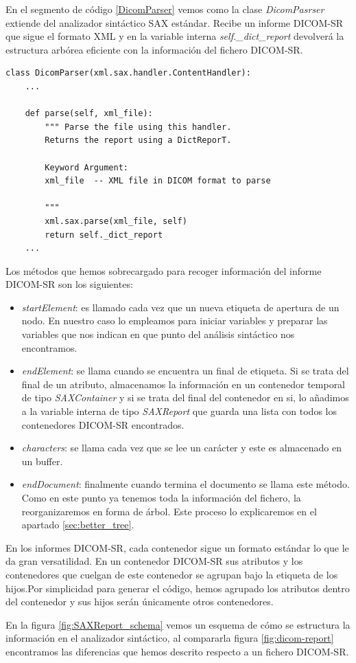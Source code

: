 En el segmento de código \ref{DicomParser} vemos como la clase \emph{DicomPasrser} extiende del analizador sintáctico SAX estándar. Recibe un informe DICOM-SR que sigue el formato XML y en la variable interna \emph{self.\_dict\_report} devolverá la estructura arbórea eficiente con la información del fichero DICOM-SR.\par

\lstset{escapechar=@,style=python}
\begin{lstlisting}[label=DicomParser,caption=Clase que analiza sintácticamente un fichero DICOM-SR]
class DicomParser(xml.sax.handler.ContentHandler):
    ...

    def parse(self, xml_file):
        """ Parse the file using this handler.
        Returns the report using a DictReporT.

        Keyword Argument:
        xml_file  -- XML file in DICOM format to parse

        """
        xml.sax.parse(xml_file, self)
        return self._dict_report
    ...
\end{lstlisting}

Los métodos que hemos sobrecargado para recoger información del informe DICOM-SR son los siguientes:
\begin{itemize}
\item \emph{startElement}: es llamado cada vez que un nueva etiqueta de apertura de un nodo. En nuestro caso lo empleamos para iniciar variables y preparar las variables que nos indican en que punto del análisis sintáctico nos encontramos.
\item \emph{endElement}: se llama cuando se encuentra un final de etiqueta. Si se trata del final de un atributo, almacenamos la información en un contenedor temporal de tipo \emph{SAXContainer} y si se trata del final del contenedor en si, lo añadimos a la variable interna de tipo \emph{SAXReport} que guarda una lista con todos los contenedores DICOM-SR encontrados. 
\item \emph{characters}: se llama cada vez que se lee un carácter y este es almacenado en un buffer.
\item \emph{endDocument}: finalmente cuando termina el documento se llama este método. Como en este punto ya tenemos toda la información del fichero, la reorganizaremos en forma de árbol. Este proceso lo explicaremos en el apartado \ref{sec:better_tree}.
\end{itemize}\medskip\par

En los informes DICOM-SR, cada contenedor sigue un formato estándar lo que le da gran versatilidad. En un contenedor DICOM-SR sus atributos y los contenedores que cuelgan de este contenedor se agrupan bajo la etiqueta de los hijos.Por simplicidad para generar el código, hemos agrupado los atributos dentro del contenedor y sus hijos serán únicamente otros contenedores.\par
En la figura \ref{fig:SAXReport_schema} vemos un esquema de cómo se estructura la información en el analizador sintáctico, al compararla figura \ref{fig:dicom-report} encontramos las diferencias que hemos descrito respecto a un fichero DICOM-SR.\par

